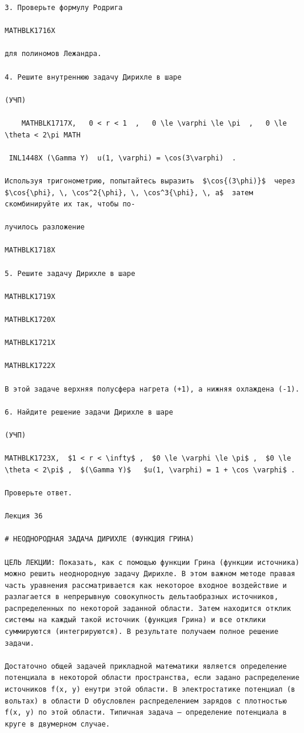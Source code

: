 \documentclass[
]{article}
\begin{document}
\begin{verbatim}
3. Проверьте формулу Родрига

MATHBLK1716X

для полиномов Лежандра.

4. Решите внутреннюю задачу Дирихле в шаре

(УЧП)

    MATHBLK1717X,   0 < r < 1  ,   0 \le \varphi \le \pi  ,   0 \le \theta < 2\pi MATH

 INL1448X (\Gamma Y)  u(1, \varphi) = \cos(3\varphi)  .

Используя тригонометрию, попытайтесь выразить  $\cos{(3\phi)}$  через  $\cos{\phi}, \, \cos^2{\phi}, \, \cos^3{\phi}, \, a$  затем скомбинируйте их так, чтобы по-

лучилось разложение

MATHBLK1718X

5. Решите задачу Дирихле в шаре

MATHBLK1719X

MATHBLK1720X

MATHBLK1721X

MATHBLK1722X

В этой задаче верхняя полусфера нагрета (+1), а нижняя охлаждена (-1).

6. Найдите решение задачи Дирихле в шаре

(УЧП) 

MATHBLK1723X,  $1 < r < \infty$ ,  $0 \le \varphi \le \pi$ ,  $0 \le \theta < 2\pi$ ,  $(\Gamma Y)$   $u(1, \varphi) = 1 + \cos \varphi$ .

Проверьте ответ.

Лекция 36

# НЕОДНОРОДНАЯ ЗАДАЧА ДИРИХЛЕ (ФУНКЦИЯ ГРИНА)

ЦЕЛЬ ЛЕКЦИИ: Показать, как с помощью функции Грина (функции источника) можно решить неоднородную задачу Дирихле. В этом важном методе правая часть уравнения рассматривается как некоторое входное воздействие и разлагается в непрерывную совокупность дельтаобразных источников, распределенных по некоторой заданной области. Затем находится отклик системы на каждый такой источник (функция Грина) и все отклики суммируются (интегрируются). В результате получаем полное решение задачи.

Достаточно общей задачей прикладной математики является определение потенциала в некоторой области пространства, если задано распределение источников f(x, y) енутри этой области. В электростатике потенциал (в вольтах) в области D обусловлен распределением зарядов с плотностью f(x, y) по этой области. Типичная задача — определение потенциала в круге в двумерном случае.


\end{verbatim}
\end{document}
